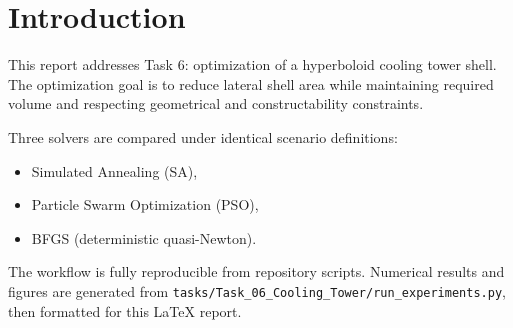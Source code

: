 \chapter{Introduction}

This report addresses Task 6: optimization of a hyperboloid cooling tower shell.
The optimization goal is to reduce lateral shell area while maintaining required volume and respecting geometrical and constructability constraints.

Three solvers are compared under identical scenario definitions:
\begin{itemize}[leftmargin=1.5em]
\item Simulated Annealing (SA),
\item Particle Swarm Optimization (PSO),
\item BFGS (deterministic quasi-Newton).
\end{itemize}

The workflow is fully reproducible from repository scripts.
Numerical results and figures are generated from \texttt{tasks/Task\_06\_Cooling\_Tower/run\_experiments.py}, then formatted for this \LaTeX{} report.
